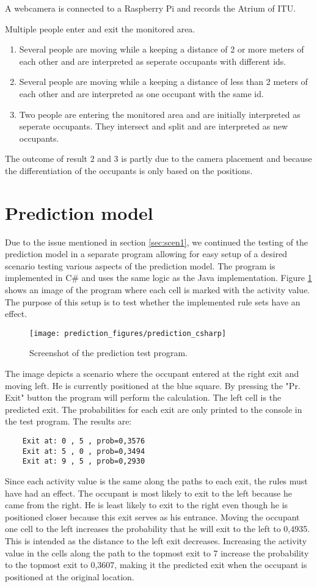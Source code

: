 A webcamera is connected to a Raspberry Pi and records the Atrium of ITU.

Multiple people enter and exit the monitored area.

\begin{enumerate}
\item Several people are moving while a keeping a distance of 2 or more meters of each other and are interpreted as seperate occupants with different ids.
\item Several people are moving while a keeping a distance of less than 2 meters of each other and are interpreted as one occupant with the same id.
\item Two people are entering the monitored area and are initially interpreted as seperate occupants. They intersect and split and are interpreted as new occupants.
\end{enumerate}

The outcome of result 2 and 3 is partly due to the camera placement and because the differentiation of the occupants is only based on the positions. 

\section{Prediction model}
\label{eval_prediction}
Due to the issue mentioned in section \ref{sec:scen1}, we continued the testing of the prediction model in a separate program allowing for easy setup of a desired scenario testing various aspects of the prediction model. The program is implemented in C\# and uses the same logic as the Java implementation. Figure \ref{fig:pred_c} shows an image of the program where each cell is marked with the activity value. The purpose of this setup is to test whether the implemented rule sets have an effect.
\begin{figure}[htb]
	\centering
	\texttt{[image: prediction\_figures/prediction\_csharp]}
	\caption{Screenshot of the prediction test program.}
	\label{fig:pred_c}
\end{figure}
The image depicts a scenario where the occupant entered at the right exit and moving left. He is currently positioned at the blue square. By pressing the "Pr. Exit" button the program will perform the calculation. The left cell is the predicted exit. The probabilities for each exit are only printed to the console in the test program. The results are:
\begin{verbatim}
    Exit at: 0 , 5 , prob=0,3576
    Exit at: 5 , 0 , prob=0,3494
    Exit at: 9 , 5 , prob=0,2930
\end{verbatim}
Since each activity value is the same along the paths to each exit, the rules must have had an effect. The occupant is most likely to exit to the left because he came from the right. He is least likely to exit to the right even though he is positioned closer because this exit serves as his entrance. Moving the occupant one cell to the left increases the probability that he will exit to the left to 0,4935. This is intended as the distance to the left exit decreases. Increasing the activity value in the cells along the path to the topmost exit to 7 increase the probability to the topmost exit to 0,3607, making it the predicted exit when the occupant is positioned at the original location. 